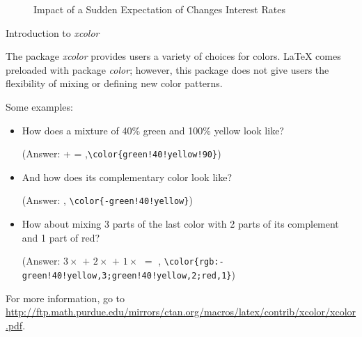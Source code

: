 \documentclass{beamer}\usepackage[]{graphicx}\usepackage[]{color}
\begin{document}
\begin{frame}
\begin{figure}[h]
{}
\caption{\footnotesize{Impact of a Sudden Expectation of Changes Interest Rates}}
\end{figure}

\end{frame}

\begin{frame}[fragile]{Introduction to \emph{\textrm{xcolor}}}

\textrm{The package \emph{xcolor} provides users a variety of choices for colors. LaTeX comes preloaded with package \emph{color}; however, this package does not give users the flexibility of mixing or defining new color patterns.}

\pause
\textrm{Some examples:}
\begin{itemize}
\pause \item How does a mixture of 40\% green and 100\% yellow look like?

{\footnotesize(Answer:  +  = ,\verb=\color{green!40!yellow!90}=)}

\pause \item And how does its complementary color look like?

{\footnotesize(Answer: , \verb=\color{-green!40!yellow}=)}

\pause \item How about mixing 3 parts of the last color with 2 parts of its complement and 1 part of red?

{\footnotesize(Answer: $3\times$ $+$ $2\times$ $+$ $1\times$ $=$ , \verb=\color{rgb:-green!40!yellow,3;green!40!yellow,2;red,1}=)}

\end{itemize}
\footnotesize{For more information, go to \url{http://ftp.math.purdue.edu/mirrors/ctan.org/macros/latex/contrib/xcolor/xcolor.pdf}.
}
\end{frame}
\end{document}
